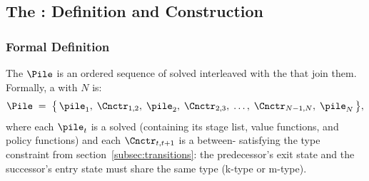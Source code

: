 \documentclass[titlepage, headings=optiontotocandhead]{econark}
\begin{document}

% 





\hypertarget{building-pile}{}
\subsection{The {\PileName}: Definition and Construction}\label{subsec:building-pile}

\subsubsection{Formal Definition}

The {\pileName} $\Pile$ is an ordered sequence of solved {\intervals}
interleaved with the {\Cncts} that join them. Formally, a {\pileName}
with $N$ {\intervals} is:
\begin{equation}
  \Pile
  \;=\;
  \bigl\{\,
    \pile_1,\;
    \Cnctr_{1,2},\;
    \pile_2,\;
    \Cnctr_{2,3},\;
    \ldots,\;
    \Cnctr_{N-1,N},\;
    \pile_N
  \,\bigr\},
  \label{eq:pile-def}
\end{equation}
where each $\pile_{t}$ is a solved {\interval} (containing its stage
list, value functions, and policy functions) and each $\Cnctr_{t,t+1}$
is a between-{\interval} {\Cnct} satisfying the type constraint from
section~\ref{subsec:transitions}: the predecessor's exit state and the
successor's entry state must share the same type (k-type or m-type).
\end{document}

